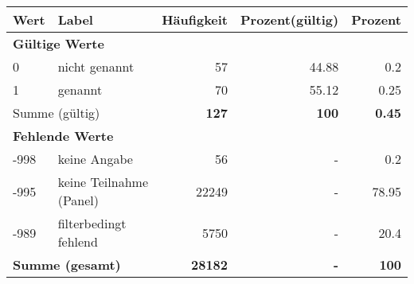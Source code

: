      \begin{longtable}{lXrrr}
     \toprule
     \textbf{Wert} & \textbf{Label} & \textbf{Häufigkeit} & \textbf{Prozent(gültig)} & \textbf{Prozent} \\
     \endhead
     \midrule
     \multicolumn{5}{l}{\textbf{Gültige Werte}}\\

     0 &
     \multicolumn{1}{X}{ nicht genannt   } &


       \num{57} &
       \num[round-mode=places,round-precision=2]{44.88} &
         \num[round-mode=places,round-precision=2]{0.2} \\

     1 &
     \multicolumn{1}{X}{ genannt   } &


       \num{70} &
       \num[round-mode=places,round-precision=2]{55.12} &
         \num[round-mode=places,round-precision=2]{0.25} \\
     \midrule
     \multicolumn{2}{l}{Summe (gültig)} &
       \textbf{\num{127}} &
     \textbf{100} &
       \textbf{\num[round-mode=places,round-precision=2]{0.45}} \\
     \multicolumn{5}{l}{\textbf{Fehlende Werte}}\\
       -998 &
       keine Angabe &
         \num{56} &
        - &
         \num[round-mode=places,round-precision=2]{0.2} \\
       -995 &
       keine Teilnahme (Panel) &
         \num{22249} &
        - &
         \num[round-mode=places,round-precision=2]{78.95} \\
       -989 &
       filterbedingt fehlend &
         \num{5750} &
        - &
         \num[round-mode=places,round-precision=2]{20.4} \\
     \midrule
     \multicolumn{2}{l}{\textbf{Summe (gesamt)}} &
          \textbf{\num{28182}} &
        \textbf{-} &
        \textbf{100} \\
     \bottomrule
     \end{longtable}
     
